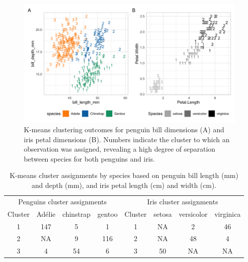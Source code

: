 \begin{Schunk}
\begin{figure}[htbp]

{\centering \includegraphics[width=6in]{fig/kmeans} 

}

\caption[K-means clustering outcomes for penguin bill dimensions (A) and iris petal dimensions (B)]{K-means clustering outcomes for penguin bill dimensions (A) and iris petal dimensions (B). Numbers indicate the cluster to which an observation was assigned, revealing a high degree of separation between species for both penguins and iris.}\label{fig:kmeans}
\end{figure}
\end{Schunk}

\begin{Schunk}
\begin{table}

\caption{\label{tab:unnamed-chunk-4}K-means cluster assignments by species based on penguin bill length (mm) and depth (mm), and iris petal length (cm) and width (cm).}
\centering
\begin{tabular}[t]{c|c|c|c|c|c|c|c}
\hline
\multicolumn{4}{c|}{Penguins cluster assignments} & \multicolumn{4}{c}{Iris cluster assignments} \\
\cline{1-4} \cline{5-8}
Cluster & Adélie & chinstrap & gentoo & Cluster & setosa & versicolor & virginica\\
\hline
1 & 147 & 5 & 1 & 1 & NA & 2 & 46\\
\hline
2 & NA & 9 & 116 & 2 & NA & 48 & 4\\
\hline
3 & 4 & 54 & 6 & 3 & 50 & NA & NA\\
\hline
\end{tabular}
\end{table}

\end{Schunk}

